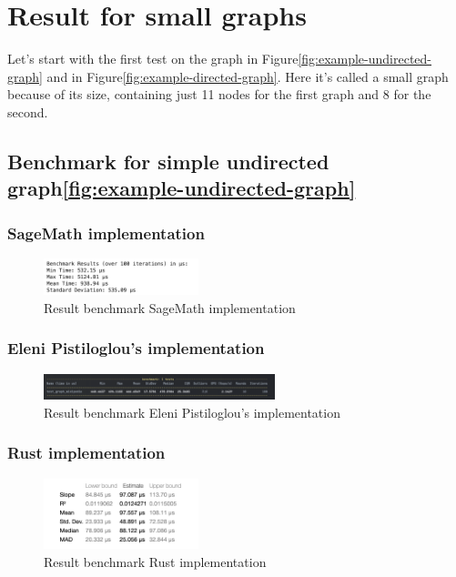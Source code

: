 \section{Result for small graphs}\label{sec:result-for-small-graphs}

Let's start with the first test on the graph in Figure\ref{fig:example-undirected-graph} and in Figure\ref{fig:example-directed-graph}.
Here it's called a small graph because of its size, containing just 11 nodes for the first graph and 8 for the second.

\newpage

\subsection{Benchmark for simple undirected graph\ref{fig:example-undirected-graph}}\label{subsec:benchmark-for-simple-undirected-graph}

\subsubsection*{SageMath implementation}
\begin{figure}[!h]
    \centering
    \includegraphics[width=0.40\textwidth]{images/benchmark/graph_wikipedia/benchmark_graph_wikipedia_sagemath}
    \caption{Result benchmark SageMath implementation}
    \label{fig:benchmark-graph-wikipedia-sagemath}
\end{figure}

\subsubsection*{Eleni Pistiloglou's implementation}
\begin{figure}[!h]
    \centering
    \includegraphics[width=0.60\textwidth]{images/benchmark/graph_wikipedia/benchmark_graph_wikipedia_python}
    \caption{Result benchmark Eleni Pistiloglou's implementation}
    \label{fig:benchmark-graph-wikipedia-python}
\end{figure}

\subsubsection*{Rust implementation}
\begin{figure}[!h]
    \centering
    \includegraphics[width=0.40\textwidth]{images/benchmark/graph_wikipedia/benchmark_graph_wikipedia_rust}
    \caption{Result benchmark Rust implementation}
    \label{fig:benchmark-graph-wikipedia-rust}
\end{figure}

